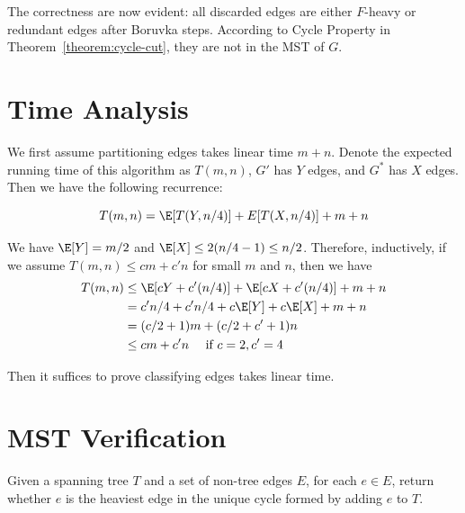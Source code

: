 The correctness are now evident: all discarded edges are either $F$-heavy or redundant edges after Boruvka steps. According to Cycle Property in Theorem~\ref{theorem:cycle-cut}, they are not in the MST of $G$.

\section{Time Analysis}

We first assume partitioning edges takes linear time $m+n$. Denote the expected running time of this algorithm as $T(m,n)$, $G'$ has $Y$ edges, and $G^*$ has $X$ edges. Then we have the following recurrence:

\[ T(m,n) = \E[T(Y, n/4)] + E[T(X, n/4)] + m + n \]

We have $\E[Y] = m/2$ and $\E[X] \le 2(n/4 - 1) \le n/2$. Therefore, inductively, if we assume $T(m,n) \le cm+c'n$ for small $m$ and $n$, then we have
\begin{align*}
	T(m,n) & \le \E[cY + c'(n/4)] + \E[cX + c'(n/4)] + m + n \\
	       & = c'n/4 + c'n/4 + c\E[Y] + c \E[X] + m + n      \\
	       & = (c/2 + 1)m + (c/2 + c' + 1)n                  \\
	       & \le cm + c'n \quad \text{ if } c = 2, c' = 4
\end{align*}

Then it suffices to prove classifying edges takes linear time.

\section{MST Verification}

\begin{problem}
Given a spanning tree $T$ and a set of non-tree edges $E$, for each $e\in E$, return whether $e$ is the heaviest edge in the unique cycle formed by adding $e$ to $T$.
\end{problem}

